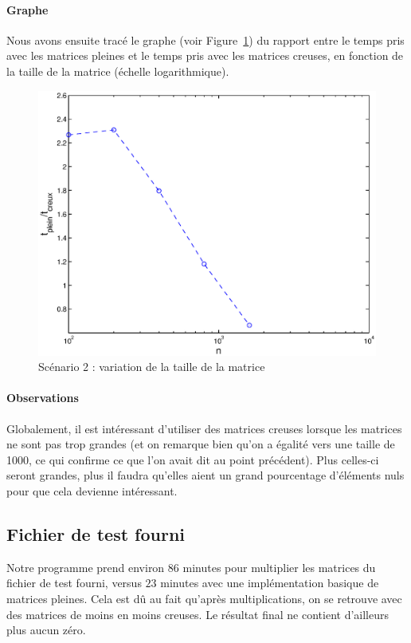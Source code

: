 \documentclass[12pt,a4paper]{article}
\begin{document}
\paragraph{Graphe}
Nous avons ensuite tracé le graphe (voir Figure~\ref{vtm}) du rapport entre le temps pris avec les matrices pleines et le temps pris avec les matrices creuses, en fonction de la taille de la matrice (échelle logarithmique).
\begin{figure}[!h]
	\begin{center}
		\includegraphics[width=15cm]{pourccst.eps}
		\caption{Scénario 2 : variation de la taille de la matrice}
		\label{vtm}
	\end{center}
\end{figure}

\paragraph{Observations}
Globalement, il est intéressant d'utiliser des matrices creuses lorsque les matrices ne sont pas trop grandes (et on remarque bien qu'on a égalité vers une taille de 1000, ce qui confirme ce que l'on avait dit au point précédent). Plus celles-ci seront grandes, plus il faudra qu'elles aient un grand pourcentage d'éléments nuls pour que cela devienne intéressant. 

\subsection{Fichier de test fourni}
Notre programme prend environ $86$ minutes pour multiplier les matrices du fichier de test fourni, versus $23$ minutes avec une implémentation basique de matrices pleines. Cela est dû au fait qu'après multiplications, on se retrouve avec des matrices de moins en moins creuses. Le résultat final ne contient d'ailleurs plus aucun zéro.
\end{document}
